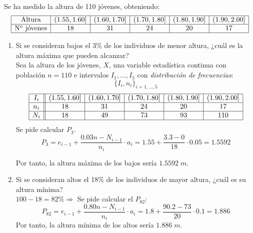 \begin{ejercicio}
    Se ha medido la altura de 110 jóvenes, obteniendo:
    \begin{equation*}
        \begin{array}{|c|c|c|c|c|c|}
            \hline
            \text{Altura} & (1.55,1.60] & (1.60,1.70] & (1.70,1.80] & (1.80,1.90] & (1.90,2.00]  \\ \hline
            \text{N$^o$ jóvenes} & 18& 31 & 24 & 20 & 17 \\ \hline 
        \end{array}
    \end{equation*}

    \begin{enumerate}
        \item Si se consideran bajos el 3\% de los individuos de menor altura, ¿cuál es la altura máxima que pueden alcanzar?\\
        
        Sea la altura de los jóvenes, $X$, una variable estadística continua con población $n=110$ e intervalos $I_1, \dots, I_5$ con \emph{distribución de frecuencias}:
        $$\{I_i, n_i\}_{i=1, \dots, 5}$$
        \begin{equation*}
            \begin{array}{|c||c|c|c|c|c|}
                \hline
                I_i & (1.55,1.60] & (1.60,1.70] & (1.70,1.80] & (1.80,1.90] & (1.90,2.00]  \\ \hline
                n_i & 18& 31 & 24 & 20 & 17 \\ \hline 
                N_i & 18& 49 & 73 & 93 & 110 \\ \hline 
            \end{array}
        \end{equation*}
        Se pide calcular $P_3$.
        $$P_3 = e_{i-1} + \frac{0.03n - N_{i-1}}{n_i}\cdot a_i
        = 1.55 + \frac{3.3 - 0}{18}\cdot 0.05 = 1.5592$$

        Por tanto, la altura máxima de los bajos sería $1.5592\;m$.

        \item Si se consideran altos el 18\% de los individuos de mayor altura, ¿cuál es su altura mínima?\\
        $100-18 = 82\% \Longrightarrow$ Se pide calcular el $P_{82}$:
        $$P_{82} = e_{i-1} + \frac{0.80n - N_{i-1}}{n_i}\cdot a_i
        = 1.8 + \frac{90.2 - 73}{20}\cdot 0.1 = 1.886$$
        Por tanto, la altura mínima de los altos sería $1.886\;m$.


\end{enumerate}
\end{ejercicio}
